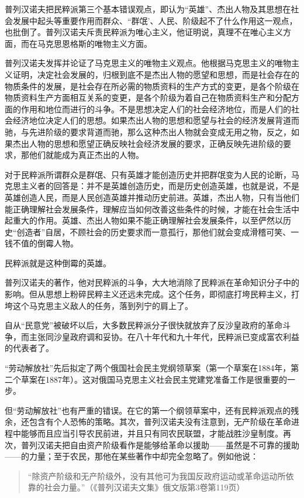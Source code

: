 普列汉诺夫把民粹派第三个基本错误观点，即认为“英雄”、杰出人物及其思想在社会发展中起头等重要作用而群众、“群氓’、人民、阶级起不了什么作用这一观点，也批倒了。普列汉诺夫斥责民粹派为唯心主义，他证明说，真理不在唯心主义方面，而在马克思恩格斯的唯物主义方面。

普列汉诺夫发挥并论证了马克思主义的唯物主义观点。他根据马克思主义的唯物主义证明，决定社会发展的，归根到底不是杰出人物的愿望和思想，而是社会存在的物质条件的发展，是社会存在所必需的物质资料的生产方式的变更，是各个阶级在物质资料生产方面相互关系的变更，是各个阶级为着自己在物质资料生产和分配方面的作用和地位而进行的斗争。不是思想决定人们的社会经济地位，而是人们的社会经济地位决定人们的思想。如果杰出人物的思想和愿望与社会的经济发展背道而驰，与先进阶级的要求背道而驰，那么这种杰出人物就会变成无用之物，反之，如果杰出人物的思想和愿望正确反映社会经济发展的要求，正确反映先进阶级的要求，那他们就能成为真正杰出的人物。

对于民粹派所谓群众是群氓、只有英雄才能创造历史并把群氓变为人民的论断，马克思主义者的回答是：并不是英雄创造历史，而是历史创造英雄，也就是说，不是英雄创造人民，而是人民创造英雄并推动历史前进。英雄，杰出人物，只有当他们能正确理解社会发展条件，理解应当如何改善这些条件的时候，才能在社会生活中起重大的作用。英雄、杰出人物如果不能正确理解社会发展条件，以至俨然以历史“创造者”自居，不顾社会的历史要求而一意孤行，那他们就会变成滑稽可笑、一钱不值的倒霉人物。

民粹派就是这种倒霉的英雄。

普列汉诺夫的著作，他对民粹派的斗争，大大地消除了民粹派在革命知识分子中的影响。但从思想上粉碎民粹主义还远未完成。这个任务，即彻底打垮民粹主义，打垮这个马克思主义敌人的任务，落到列宁的肩上了。

自从“民意党”被破坏以后，大多数民粹派分子很快就放弃了反沙皇政府的革命斗争，而主张同沙皇政府调和妥协。在八十年代和九十年代，民粹派已变成富农利益的代表者了。

“劳动解放社”先后拟定了两个俄国社会民主党纲领草案（第一个草案在1884年，第二个草案在1887年）。这对俄国马克思主义社会民主党建党准备工作是很重要的一步。

但“劳动解放社”也有严重的错误。在它的第一个纲领草案中，还有民粹派观点的残余，还包含有个人恐怖的策略。其次，普列汉诺夫没有注意到，无产阶级在革命进程中能够而且应当引导农民前进，并且只有同农民联盟，才能战胜沙皇制度。再次，普列汉诺夫把自由资产阶级看作是能够给革命以援助——虽然是不可靠的援助——的力量；至于农民，那他在某些著作中却完全忽略了。例如他说：

\begin{quotation}
“除资产阶级和无产阶级外，没有其他可为我国反政府运动或革命运动所依靠的社会力量。”（《普列汉诺夫文集》俄文版第3卷第119页）
\end{quotation}

